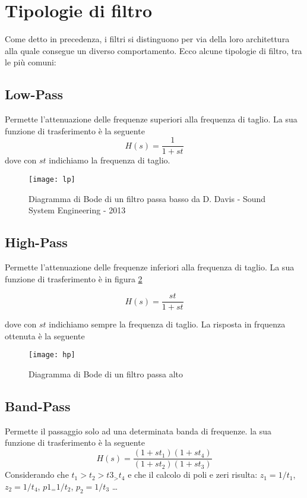 \section{Tipologie di filtro}
Come detto in precedenza, i filtri si distinguono per via della loro architettura alla quale consegue un diverso comportamento. Ecco alcune tipologie di filtro, tra le più comuni:

\subsection{Low-Pass}
Permette l’attenuazione delle frequenze superiori alla frequenza di taglio.
La sua funzione di trasferimento è la seguente
\begin{equation}
H(s)=\frac{1}{1+st}
\end{equation}
dove con $st$ indichiamo la frequenza di taglio.

\begin{figure}[h]
\centering
\texttt{[image: lp]}
\caption{Diagramma di Bode di un filtro passa basso \newline \scriptsize{ da D. Davis - Sound System Engineering - 2013}}
\label{fig:lp}
\end{figure}

\subsection{High-Pass}
Permette l’attenuazione delle frequenze inferiori alla frequenza di taglio.
La sua funzione di trasferimento è in figura \ref{fig:hp}

\begin{equation}
H(s)=\frac{st}{1+st}
\end{equation}

dove con $st$ indichiamo sempre la frequenza di taglio.
La risposta in frquenza ottenuta è la seguente
\begin{figure}[htp]
\centering
\texttt{[image: hp]}
\caption{Diagramma di Bode di un filtro passa alto}
\label{fig:hp}
\end{figure}

\subsection{Band-Pass}
Permette il passaggio solo ad una determinata banda di frequenze.
la sua funzione di trasferimento è la seguente
\begin{equation}
H(s)=\frac{(1+st_1)(1+st_4)}{(1+st_2)(1+st_3)}
\end{equation}
Considerando che $t_1>t_2>t3_>t_4$ e che il calcolo di poli e zeri risulta: $z_1=1/t_1$, $z_2=1/t_4$, $p1_=1/t_2$, $p_2=1/t_3$ \dots


